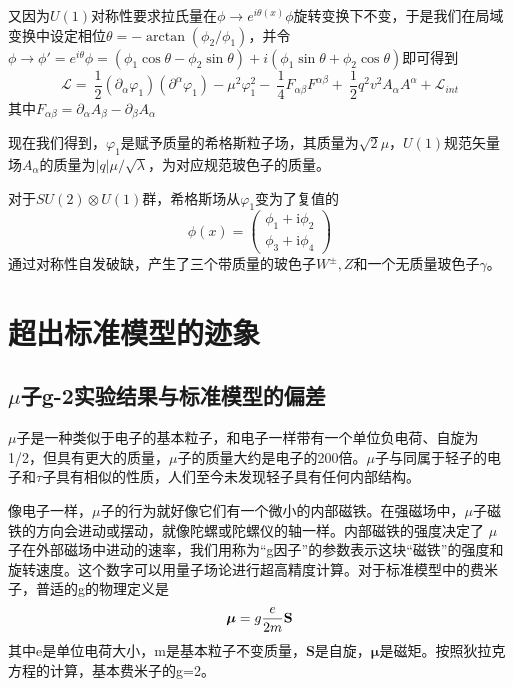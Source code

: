 又因为$U(1)$对称性要求拉氏量在$\phi\to e^{i\theta(x)}\phi$旋转变换下不变，于是我们在局域变换中设定相位$\theta=-\arctan{(\phi_2/\phi_1)}$，并令$\phi\to \phi'=e^{i\theta}\phi=(\phi_1\cos{\theta}-\phi_2\sin{\theta})
+i(\phi_1\sin{\theta}+\phi_2\cos{\theta})$即可得到
\begin{equation}
    \mathcal{L}=\ \frac{1}{2} (\partial_{\alpha}\varphi_1)(\partial^{\alpha}\varphi_1) 
-\mu^2\varphi_1^2  -\ \frac{1}{4}F_{\alpha\beta}F^{\alpha\beta} +\ \frac{1}{2}q^2 v^2 A_{\alpha}A^{\alpha} +\mathcal{L}_{int}
\end{equation}
其中$F_{\alpha\beta}=\partial_\alpha A_\beta-\partial_\beta A_\alpha$

现在我们得到，$\varphi_1$是赋予质量的希格斯粒子场，其质量为$\sqrt{2}\mu$，$U(1)$规范矢量场$A_\alpha$的质量为$|q|\mu/\sqrt{\lambda}$，为对应规范玻色子的质量。

对于$SU(2)\otimes U(1)$群，希格斯场从$\varphi_1$变为了复值的
\begin{equation}
    \phi (x) ={\left ( \begin{matrix} \phi_1 + \mathrm{i} \phi_2\\ \phi_3 + \mathrm{i} \phi_4 \end{matrix} \right )}
\end{equation}
通过对称性自发破缺，产生了三个带质量的玻色子$W^\pm,Z$和一个无质量玻色子$\gamma$。

\section{超出标准模型的迹象}
\subsection{$\mu$子g-2实验结果与标准模型的偏差}
$\mu$子是一种类似于电子的基本粒子，和电子一样带有一个单位负电荷、自旋为1/2，但具有更大的质量，$\mu$子的质量大约是电子的200倍。$\mu$子与同属于轻子的电子和$\tau$子具有相似的性质，人们至今未发现轻子具有任何内部结构。

像电子一样，$\mu$子的行为就好像它们有一个微小的内部磁铁。在强磁场中，$\mu$子磁铁的方向会进动或摆动，就像陀螺或陀螺仪的轴一样。内部磁铁的强度决定了 $\mu$ 子在外部磁场中进动的速率，我们用称为“g因子”的参数表示这块“磁铁”的强度和旋转速度。这个数字可以用量子场论进行超高精度计算。对于标准模型中的费米子，普适的g的物理定义是
\begin{equation}
    \boldsymbol \mu = g {e \over 2m} \mathbf S 
\end{equation}
其中e是单位电荷大小，m是基本粒子不变质量，$\mathbf S $是自旋，$\boldsymbol\mu$是磁矩。按照狄拉克方程的计算，基本费米子的g=2。

